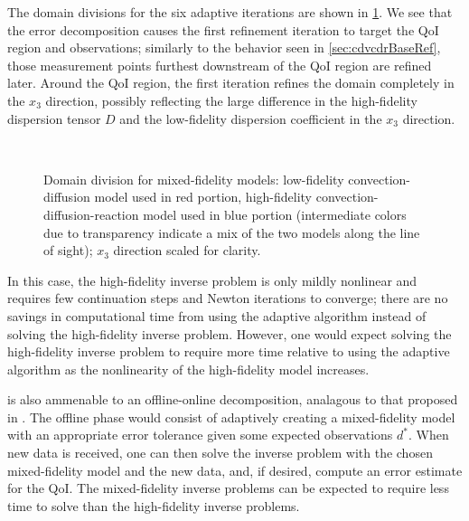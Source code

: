 The domain divisions for the six adaptive iterations are shown in \cref{fig:divvy3D}. We see that the error decomposition causes the first refinement iteration to target the QoI region and observations; similarly to the behavior seen in \cref{sec:cdvcdrBaseRef}, those measurement points furthest downstream of the QoI region are refined later. Around the QoI region, the first iteration refines the domain completely in the $x_3$ direction, possibly reflecting the large difference in the high-fidelity dispersion tensor $D$ and the low-fidelity dispersion coefficient in the $x_3$ direction.
%
\begin{figure}[htbp]
\centering
{}
 \\
\caption{Domain division for mixed-fidelity models: low-fidelity convection-diffusion model used in red portion, high-fidelity convection-diffusion-reaction model used in blue portion (intermediate colors due to transparency indicate a mix of the two models along the line of sight); $x_3$ direction scaled for clarity.}
\label{fig:divvy3D}
\end{figure} 
%

In this case, the high-fidelity inverse problem is only mildly nonlinear and requires few continuation steps and Newton iterations to converge; there are no savings in computational time from using the adaptive algorithm instead of solving the high-fidelity inverse problem. However, one would expect solving the high-fidelity inverse problem to require more time relative to using the adaptive algorithm as the nonlinearity of the high-fidelity model increases. 

 is also ammenable to an offline-online decomposition, analagous to that proposed in \cite{LiebWill13}. The offline phase would consist of adaptively creating a mixed-fidelity model with an appropriate error tolerance given some expected observations $d^*$. When new data is received, one can then solve the inverse problem with the chosen mixed-fidelity model and the new data, and, if desired, compute an error estimate for the QoI. The mixed-fidelity inverse problems can be expected to require less time to solve than the high-fidelity inverse problems.

